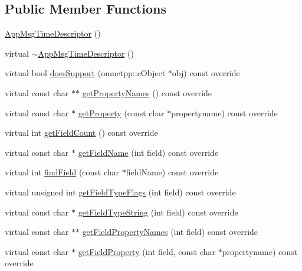 \subsection*{Public Member Functions}
\begin{DoxyCompactItemize}
\item 
\hyperlink{class_app_msg_time_descriptor_aa1c0a48d43a21f17d556759173b321b5}{App\+Msg\+Time\+Descriptor} ()
\item 
virtual \hyperlink{class_app_msg_time_descriptor_a3ffd811d3278f9847f320937f8dc3767}{$\sim$\+App\+Msg\+Time\+Descriptor} ()
\item 
virtual bool \hyperlink{class_app_msg_time_descriptor_a97ef37da3e4190f8e45a0ce2ee871e18}{does\+Support} (omnetpp\+::c\+Object $\ast$obj) const override
\item 
virtual const char $\ast$$\ast$ \hyperlink{class_app_msg_time_descriptor_a88a8a3b34a9af1d9a73c6601969cc5fc}{get\+Property\+Names} () const override
\item 
virtual const char $\ast$ \hyperlink{class_app_msg_time_descriptor_ab9f6a79300cffb71dda8372c3c4bef83}{get\+Property} (const char $\ast$propertyname) const override
\item 
virtual int \hyperlink{class_app_msg_time_descriptor_a754ebbbce52e3b7bfe97a0aef282b3a3}{get\+Field\+Count} () const override
\item 
virtual const char $\ast$ \hyperlink{class_app_msg_time_descriptor_ac986a70c33fc35e90bdf543c6b4d2fe4}{get\+Field\+Name} (int field) const override
\item 
virtual int \hyperlink{class_app_msg_time_descriptor_a18f5251d319288bc3b893b1186b7777f}{find\+Field} (const char $\ast$field\+Name) const override
\item 
virtual unsigned int \hyperlink{class_app_msg_time_descriptor_a9c4f1ee9ba789821e48b7cf0e4be6511}{get\+Field\+Type\+Flags} (int field) const override
\item 
virtual const char $\ast$ \hyperlink{class_app_msg_time_descriptor_a576cceeffd841b561c7c8f9bb92fff85}{get\+Field\+Type\+String} (int field) const override
\item 
virtual const char $\ast$$\ast$ \hyperlink{class_app_msg_time_descriptor_adbedb4b0c116a04c4fb28bf1d6875e79}{get\+Field\+Property\+Names} (int field) const override
\item 
virtual const char $\ast$ \hyperlink{class_app_msg_time_descriptor_afabdeba686e7822bf682e81b6ee7009d}{get\+Field\+Property} (int field, const char $\ast$propertyname) const override
\item 

\end{DoxyCompactItemize}
